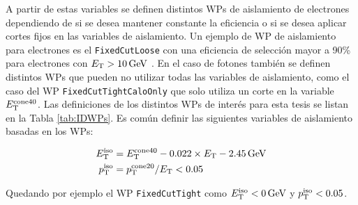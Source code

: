 
A partir de estas variables se definen distintos WPs de aislamiento de electrones dependiendo de si se desea mantener constante la eficiencia o si se desea aplicar cortes fijos en las variables de aislamiento. Un ejemplo de WP de aislamiento para electrones es el \texttt{FixedCutLoose} con una eficiencia de selección mayor a 90\% para electrones con $E_{\text{T}}>10\,\text{GeV}$ \cite{EGAM-2018-01}. En el caso de fotones también se definen distintos WPs que pueden no utilizar todas las variables de aislamiento, como el caso del WP \texttt{FixedCutTightCaloOnly} que solo utiliza un corte en la variable $E_{\text{T}}^{\text{cone40}}$. Las definiciones de los distintos WPs de interés para esta tesis se listan en la Tabla \ref{tab:IDWPs}. Es común definir las siguientes variables de aislamiento basadas en los WPs:

\begin{equation}
  \begin{split}
    E_{\text{T}}^{\text{iso}} & = E_{\text{T}}^{\text{cone40}} - 0.022\times E_{\text{T}} - 2.45\,\text{GeV} \\
    p_{\text{T}}^{\text{iso}} & = p_{\text{T}}^{\text{cone20}}/E_{\text{T}}<0.05 \\
  \end{split}
\end{equation}
 
Quedando por ejemplo el WP \texttt{FixedCutTight} como $E_{\text{T}}^{\text{iso}}<0\,\text{GeV}$ y $p_{\text{T}}^{\text{iso}}<0.05$.



